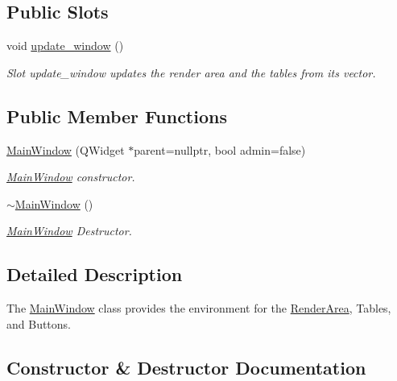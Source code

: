 \subsection*{Public Slots}
\begin{DoxyCompactItemize}
\item 
void \hyperlink{classMainWindow_a59351bdf1235b640a416121e7b8d89d3}{update\+\_\+window} ()
\begin{DoxyCompactList}\small\item\em Slot update\+\_\+window updates the render area and the tables from its vector. \end{DoxyCompactList}\end{DoxyCompactItemize}
\subsection*{Public Member Functions}
\begin{DoxyCompactItemize}
\item 
\hyperlink{classMainWindow_a16bf19588e7e7cb601b4e01661a9141b}{Main\+Window} (Q\+Widget $\ast$parent=nullptr, bool admin=false)
\begin{DoxyCompactList}\small\item\em \hyperlink{classMainWindow}{Main\+Window} constructor. \end{DoxyCompactList}\item 
\hyperlink{classMainWindow_ae98d00a93bc118200eeef9f9bba1dba7}{$\sim$\+Main\+Window} ()
\begin{DoxyCompactList}\small\item\em \hyperlink{classMainWindow}{Main\+Window} Destructor. \end{DoxyCompactList}\end{DoxyCompactItemize}


\subsection{Detailed Description}
The \hyperlink{classMainWindow}{Main\+Window} class provides the environment for the \hyperlink{classRenderArea}{Render\+Area}, Tables, and Buttons. 

\subsection{Constructor \& Destructor Documentation}
